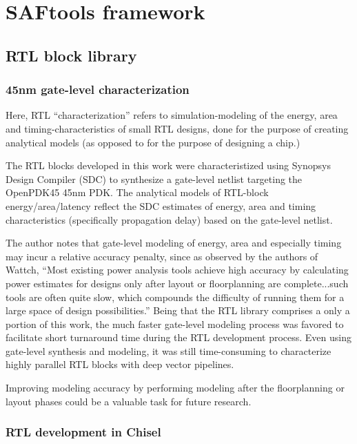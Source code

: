 \chapter{SAFtools framework}

\section{RTL block library}

\subsection{45nm gate-level characterization}

Here, RTL ``characterization'' refers to simulation-modeling of the energy, area and timing-characteristics of small RTL designs, done for the purpose of creating analytical models (as opposed to for the purpose of designing a chip.)

The RTL blocks developed in this work were characteristized using Synopsys Design Compiler (SDC) to synthesize a gate-level netlist targeting the OpenPDK45 45nm PDK. The analytical models of RTL-block energy/area/latency reflect the SDC estimates of energy, area and timing characteristics (specifically propagation delay) based on the gate-level netlist.

The author notes that gate-level modeling of energy, area and especially timing may incur a relative accuracy penalty, since as observed by the authors of Wattch\cite{wattch}, ``Most existing power analysis tools achieve high accuracy by calculating power estimates for designs only after layout or floorplanning are complete...such tools are often quite slow, which compounds the difficulty of running them for a large space of design possibilities.'' Being that the RTL library comprises a only a portion of this work, the much faster gate-level modeling process was favored to facilitate short turnaround time during the RTL development process. Even using gate-level synthesis and modeling, it was still time-consuming to characterize highly parallel RTL blocks with deep vector pipelines. 

Improving modeling accuracy by performing modeling after the floorplanning or layout phases could be a valuable task for future research.

\subsection{RTL development in Chisel}

